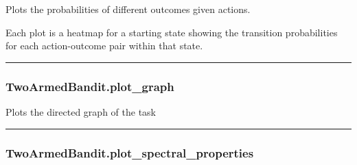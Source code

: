 Plots the probabilities of different outcomes given actions.

Each plot is a heatmap for a starting state showing the transition
probabilities for each action-outcome pair within that state.

\begin{center}\rule{0.5\linewidth}{\linethickness}\end{center}

\subsubsection{TwoArmedBandit.plot\_graph}\label{twoarmedbandit.plot_graph}

\begin{Shaded}
\begin{Highlighting}[]
\OperatorTok{=}\OperatorTok{=}\OperatorTok{=}\OperatorTok{=}\OperatorTok{=}\OperatorTok{=}\OperatorTok{=}\OperatorTok{=}\NormalTok{)}
\end{Highlighting}
\end{Shaded}

Plots the directed graph of the task

\begin{center}\rule{0.5\linewidth}{\linethickness}\end{center}

\subsubsection{TwoArmedBandit.plot\_spectral\_properties}\label{twoarmedbandit.plot_spectral_properties}

\begin{Shaded}
\begin{Highlighting}[]
\OperatorTok{=}\OperatorTok{=}\OperatorTok{=}\NormalTok{)}
\end{Highlighting}
\end{Shaded}

